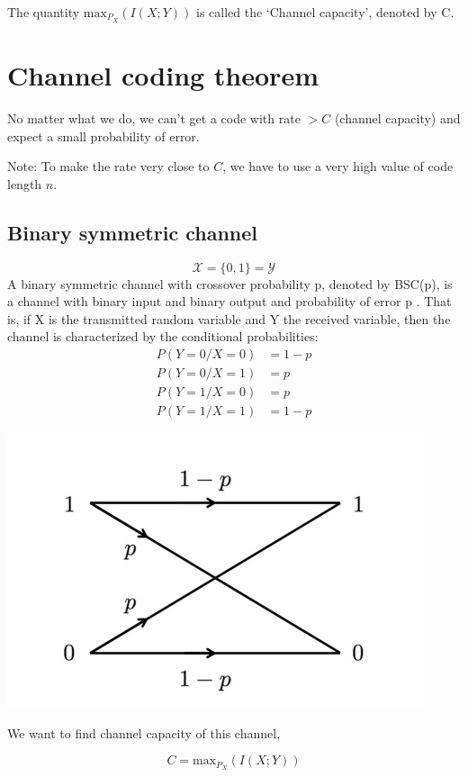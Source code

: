 \documentclass{article}
\begin{document}
The quantity $\text{max}_{P_X} (I(X;Y))$ is called the `Channel capacity', denoted by C.

\section{Channel coding theorem}

No matter what we do, we can't get a code with rate $> C$ (channel capacity) and expect a small probability of error.

Note: To make the rate very close to $C$, we have to use a very high value of code length $n$.

\subsection{Binary symmetric channel}
$$ \mathcal{X}= \{ 0,1\}= \mathcal{Y}$$
A binary symmetric channel with crossover probability p, denoted by BSC(p), is a channel with binary input and binary output and probability of error p . That is, if X  is the transmitted random variable and Y  the received variable, then the channel is characterized by the conditional probabilities:
\begin{align*}
    P(Y=0/X=0)&=1-p \\
    P(Y=0/X=1)&=p \\
    P(Y=1/X=0)&=p \\
    P(Y=1/X=1)&=1-p
\end{align*}

\includegraphics[width=\textwidth]{BSC.png}

We want to find channel capacity of this channel,

$$ C= \text{max}_{P_X} (I(X;Y))$$
\end{document}

